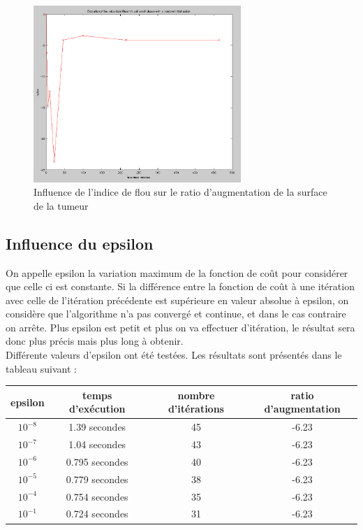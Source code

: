 		\begin{figure}[H]
			\centering
			\includegraphics[width=0.7\textwidth]{images/2-flou.png}
			\caption{Influence de l'indice de flou sur le ratio d'augmentation de la surface de la tumeur}
			\label{fig:flou}
		\end{figure}

	\subsection{Influence du epsilon} %
	\label{ssub:influence_du_epsilon}
		On appelle epsilon la variation maximum de la fonction de coût pour considérer que celle ci est constante. Si la différence entre la fonction de coût à une itération avec celle de l'itération précédente est supérieure en valeur absolue à epsilon, on considère que l'algorithme n'a pas convergé et continue, et dans le cas contraire on arrête. Plus epsilon est petit et plus on va effectuer d'itération, le résultat sera donc plus précis mais plus long à obtenir.\\

		Différente valeurs d'epsilon ont été testées. Les résultats sont présentés dans le tableau suivant :\\

		\begin{tabular}{|c|c|c|c|}
			\hline
			epsilon & temps d’exécution & nombre d'itérations & ratio d'augmentation \\ \hline
			$10^{-8}$ & 1.39 secondes & 45 & -6.23 \\
			$10^{-7}$ & 1.04 secondes & 43 & -6.23 \\
			$10^{-6}$ & 0.795 secondes & 40 & -6.23 \\
			$10^{-5}$ & 0.779 secondes & 38 & -6.23 \\
			$10^{-4}$ & 0.754 secondes & 35 & -6.23 \\
			$10^{-1}$ & 0.724 secondes & 31 & -6.23 \\
			\hline
		\end{tabular}
		\bigskip

